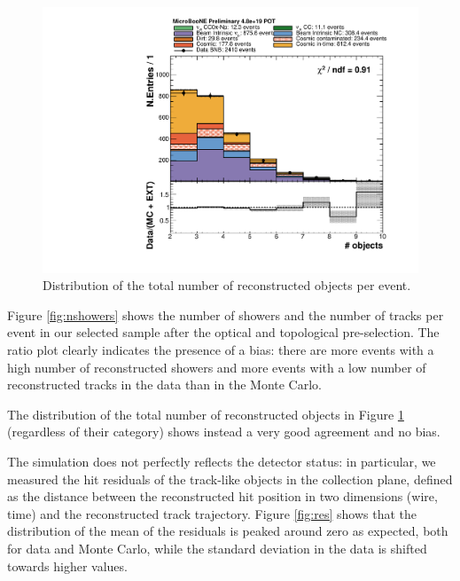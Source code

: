 \begin{figure}[htbp]
\centering
  \includegraphics[width=0.65\linewidth]{figures/h_n_objects.pdf}
  \caption{Distribution of the total number of reconstructed objects per event.}
  \label{fig:nobjects}
\end{figure}

Figure \ref{fig:nshowers} shows the number of showers and the number of tracks per event in our selected sample after the optical and topological pre-selection. The ratio plot clearly indicates the presence of a bias: there are more events with a high number of reconstructed showers and more events with a low number of reconstructed tracks in the data than in the Monte Carlo. 

The distribution of the total number of reconstructed objects in Figure \ref{fig:nobjects} (regardless of their category) shows instead a very good agreement and no bias.


The simulation does not perfectly reflects the detector status: in particular, we measured the hit residuals of the track-like objects in the collection plane, defined as the distance between the reconstructed hit position in two dimensions (wire, time) and the reconstructed track trajectory. Figure \ref{fig:res} shows that the distribution of the mean of the residuals is peaked around zero as expected, both for data and Monte Carlo, while the standard deviation in the data is shifted towards higher values. 

